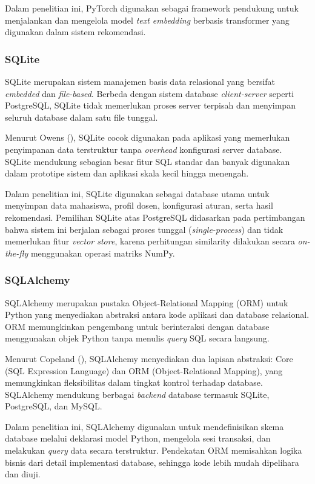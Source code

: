 Dalam penelitian ini, PyTorch digunakan sebagai framework pendukung untuk menjalankan dan mengelola model \textit{text embedding} berbasis transformer yang digunakan dalam sistem rekomendasi.

\subsubsection{SQLite}\label{sqlite}

SQLite merupakan sistem manajemen basis data relasional yang bersifat \textit{embedded} dan \textit{file-based}. Berbeda dengan sistem database \textit{client-server} seperti PostgreSQL, SQLite tidak memerlukan proses server terpisah dan menyimpan seluruh database dalam satu file tunggal.

Menurut Owens (\citeyear{owens2006sqlite}), SQLite cocok digunakan pada aplikasi yang memerlukan penyimpanan data terstruktur tanpa \textit{overhead} konfigurasi server database. SQLite mendukung sebagian besar fitur SQL standar dan banyak digunakan dalam prototipe sistem dan aplikasi skala kecil hingga menengah.

Dalam penelitian ini, SQLite digunakan sebagai database utama untuk menyimpan data mahasiswa, profil dosen, konfigurasi aturan, serta hasil rekomendasi. Pemilihan SQLite atas PostgreSQL didasarkan pada pertimbangan bahwa sistem ini berjalan sebagai proses tunggal (\textit{single-process}) dan tidak memerlukan fitur \textit{vector store}, karena perhitungan similarity dilakukan secara \textit{on-the-fly} menggunakan operasi matriks NumPy.

\subsubsection{SQLAlchemy}\label{sqlalchemy}

SQLAlchemy merupakan pustaka Object-Relational Mapping (ORM) untuk Python yang menyediakan abstraksi antara kode aplikasi dan database relasional. ORM memungkinkan pengembang untuk berinteraksi dengan database menggunakan objek Python tanpa menulis \textit{query} SQL secara langsung.

Menurut Copeland (\citeyear{copeland2008sqlalchemy}), SQLAlchemy menyediakan dua lapisan abstraksi: Core (SQL Expression Language) dan ORM (Object-Relational Mapping), yang memungkinkan fleksibilitas dalam tingkat kontrol terhadap database. SQLAlchemy mendukung berbagai \textit{backend} database termasuk SQLite, PostgreSQL, dan MySQL.

Dalam penelitian ini, SQLAlchemy digunakan untuk mendefinisikan skema database melalui deklarasi model Python, mengelola sesi transaksi, dan melakukan \textit{query} data secara terstruktur. Pendekatan ORM memisahkan logika bisnis dari detail implementasi database, sehingga kode lebih mudah dipelihara dan diuji.

